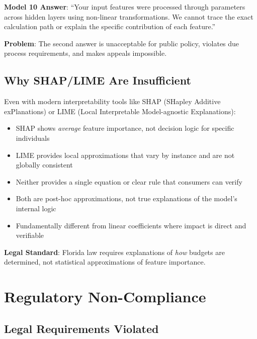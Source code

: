\textbf{Model 10 Answer}: ``Your \ModelTenRobustFeatures{} input features were processed through \ModelTenTotalParams{} parameters across \ModelTenHiddenLayers{} hidden layers using non-linear transformations. We cannot trace the exact calculation path or explain the specific contribution of each feature.''

\textbf{Problem}: The second answer is unacceptable for public policy, violates due process requirements, and makes appeals impossible.

\subsection{Why SHAP/LIME Are Insufficient}

Even with modern interpretability tools like SHAP (SHapley Additive exPlanations) or LIME (Local Interpretable Model-agnostic Explanations):

\begin{itemize}
    \item SHAP shows \textit{average} feature importance, not decision logic for specific individuals
    \item LIME provides local approximations that vary by instance and are not globally consistent
    \item Neither provides a single equation or clear rule that consumers can verify
    \item Both are post-hoc approximations, not true explanations of the model's internal logic
    \item Fundamentally different from linear coefficients where impact is direct and verifiable
\end{itemize}

\textbf{Legal Standard}: Florida law requires explanations of \textit{how} budgets are determined, not statistical approximations of feature importance.

\section{Regulatory Non-Compliance}

\subsection{Legal Requirements Violated}

